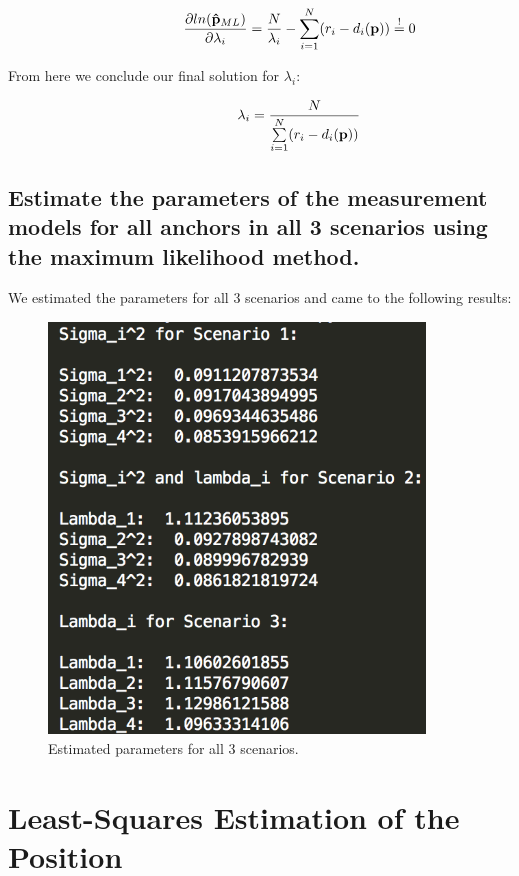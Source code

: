 \begin{align*}
\hspace*{2cm}
\dfrac{\partial ln(\mathbf{\hat{p}}_{ML})}{\partial\lambda_i} = \dfrac{N}{\lambda_i} - \sum\limits_{i=1}^N (r_i-d_i(\mathbf{p})) \stackrel{!}{=} 0
\end{align*}

From here we conclude our final solution for $\lambda_i$:

\begin{align*}
\hspace*{2cm}
\lambda_i = \dfrac{N}{\sum\limits_{i=1}^N (r_i-d_i(\mathbf{p}))}
\end{align*}



\subsection{Estimate the parameters of the measurement models for all anchors in all 3 scenarios using the maximum likelihood method.}

We estimated the parameters for all 3 scenarios and came to the following results:

\begin{figure}[H]
	\centering
\includegraphics[width=10cm]{estimated_params.png}
	\caption{Estimated parameters for all 3 scenarios.}
	\label{fig1:params}
\end{figure}

\section{Least-Squares Estimation of the Position}
